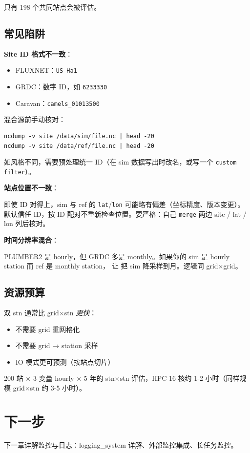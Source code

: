 只有 198 个共同站点会被评估。

\subsection{常见陷阱}

\textbf{Site ID 格式不一致}：

\begin{itemize}
  \item FLUXNET：\texttt{US-Ha1}
  \item GRDC：数字 ID，如 \texttt{6233330}
  \item Caravan：\texttt{camels\_01013500}
\end{itemize}

混合源前手动核对：

\begin{verbatim}
ncdump -v site /data/sim/file.nc | head -20
ncdump -v site /data/ref/file.nc | head -20
\end{verbatim}

如风格不同，需要预处理统一 ID（在 sim 数据写出时改名，或写一个 \texttt{custom filter}）。

\textbf{站点位置不一致}：

即使 ID 对得上，sim 与 ref 的 \texttt{lat}/\texttt{lon} 可能略有偏差（坐标精度、版本变更）。\openbench{} 默认信任 ID，按 ID 配对不重新检查位置。要严格：自己 \texttt{merge} 两边 site / lat / lon 列后核对。

\textbf{时间分辨率混合}：

PLUMBER2 是 hourly，但 GRDC 多是 monthly。如果你的 sim 是 hourly station 而 ref 是 monthly station， 让 \openbench{} 把 sim 降采样到月。逻辑同 grid×grid。

\subsection{资源预算}

双 stn 通常比 grid×stn \emph{更快}：

\begin{itemize}
  \item 不需要 grid 重网格化
  \item 不需要 grid → station 采样
  \item IO 模式更可预测（按站点切片）
\end{itemize}

200 站 × 3 变量 hourly × 5 年的 stn×stn 评估，HPC 16 核约 1-2 小时（同样规模 grid×stn 约 3-5 小时）。

\section{下一步}

下一章详解监控与日志：logging\_system 详解、外部监控集成、长任务监控。
